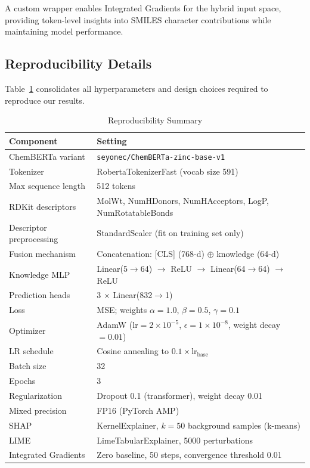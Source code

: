 \documentclass[preprint,12pt]{elsarticle}
\begin{document}
A custom wrapper enables Integrated Gradients for the hybrid input space, providing token-level insights into SMILES character contributions while maintaining model performance.

\subsection{Reproducibility Details}

Table~\ref{tab:reproducibility} consolidates all hyperparameters and design choices required to reproduce our results.

\begin{table}[H]
\centering
\caption{Reproducibility Summary}
\label{tab:reproducibility}
\small
\begin{tabular}{l l}
\toprule
\textbf{Component} & \textbf{Setting} \\
\midrule
ChemBERTa variant & \texttt{seyonec/ChemBERTa-zinc-base-v1} \\
Tokenizer & RobertaTokenizerFast (vocab size 591) \\
Max sequence length & 512 tokens \\
\midrule
RDKit descriptors & MolWt, NumHDonors, NumHAcceptors, LogP, NumRotatableBonds \\
Descriptor preprocessing & StandardScaler (fit on training set only) \\
\midrule
Fusion mechanism & Concatenation: [CLS] (768-d) $\oplus$ knowledge (64-d) \\
Knowledge MLP & Linear(5$\to$64) $\to$ ReLU $\to$ Linear(64$\to$64) $\to$ ReLU \\
Prediction heads & 3 $\times$ Linear(832$\to$1) \\
\midrule
Loss & MSE; weights $\alpha{=}1.0$, $\beta{=}0.5$, $\gamma{=}0.1$ \\
Optimizer & AdamW ($\text{lr}=2\!\times\!10^{-5}$, $\epsilon{=}1\!\times\!10^{-8}$, weight decay $= 0.01$) \\
LR schedule & Cosine annealing to $0.1 \times \text{lr}_\text{base}$ \\
Batch size & 32 \\
Epochs & 3 \\
Regularization & Dropout 0.1 (transformer), weight decay 0.01 \\
Mixed precision & FP16 (PyTorch AMP) \\
\midrule
SHAP & KernelExplainer, $k{=}50$ background samples (k-means) \\
LIME & LimeTabularExplainer, 5000 perturbations \\
Integrated Gradients & Zero baseline, 50 steps, convergence threshold 0.01 \\
\bottomrule
\end{tabular}
\end{table}
\end{document}
